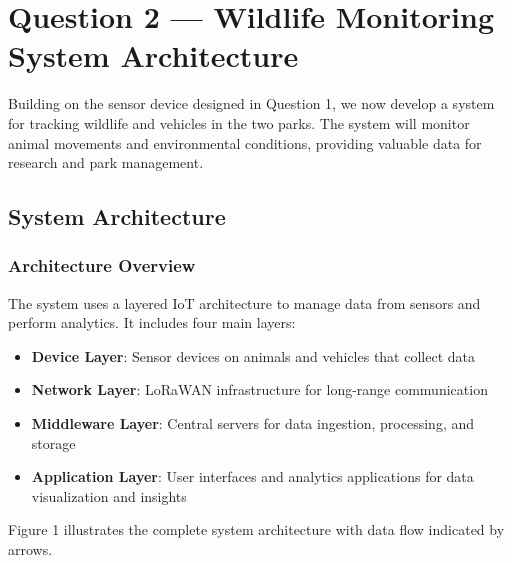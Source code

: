 \section{Question 2 --- Wildlife Monitoring System Architecture}

Building on the sensor device designed in Question 1, we now develop a system for tracking wildlife and vehicles in the two parks. The system will monitor animal movements and environmental conditions, providing valuable data for research and park management.

\subsection{System Architecture}

\subsubsection{Architecture Overview}
The system uses a layered IoT architecture to manage data from sensors and perform analytics. It includes four main layers:

\begin{itemize}
  \item \textbf{Device Layer}: Sensor devices on animals and vehicles that collect data
  \item \textbf{Network Layer}: LoRaWAN infrastructure for long-range communication
  \item \textbf{Middleware Layer}: Central servers for data ingestion, processing, and storage
  \item \textbf{Application Layer}: User interfaces and analytics applications for data visualization and insights
\end{itemize}

Figure 1 illustrates the complete system architecture with data flow indicated by arrows.

